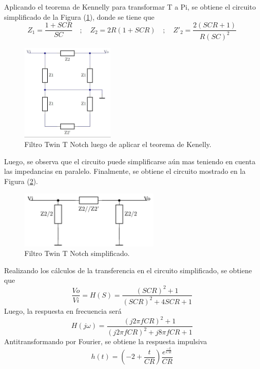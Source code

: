 \documentclass[a4paper]{article}
\begin{document}
Aplicando el teorema de Kennelly para transformar T a Pi, se obtiene el circuito simplificado de la Figura (\ref{fig:filtrosimplificado}), donde se tiene que
\[Z_1=\frac{1+SCR}{SC}\hspace{1em};\hspace{1em} Z_2=2R(1+SCR) \hspace{1em};\hspace{1em} Z'_2=\frac{2(SCR+1)}{R(SC)^2}\]

\begin{figure}[H]
	\centering
	\includegraphics[width=0.4\textwidth, trim={0 0.1cm  0 0.1cm},clip]{ej1kennellly.jpg}
\caption{Filtro Twin T Notch luego de aplicar el teorema de Kenelly.}
	\label{fig:filtrosimplificado}
\end{figure}

Luego, se observa que el circuito puede simplificarse aún mas teniendo en cuenta las impedancias en paralelo. Finalmente, se obtiene el circuito mostrado en la Figura (\ref{fig:filtrofinal}).

\begin{figure}[H]
	\centering
	\includegraphics[width=0.6\textwidth]{ej1simplificado.jpg}
\caption{Filtro Twin T Notch simplificado.}
	\label{fig:filtrofinal}
\end{figure}

Realizando los cálculos de la transferencia en el circuito simplificado, se obtiene que
\[ \frac{Vo}{Vi}=H(S)=\frac{ \left( SCR \right)^2 + 1}{\left( SCR \right)^2 + 4SCR + 1} \] 
Luego, la respuesta en frecuencia será
\[H(j\omega)=\frac{ \left( j 2\pi f CR \right)^2 + 1}{\left( j 2\pi f CR \right)^2 + j 8\pi fCR + 1} \]
Antitransformando por Fourier, se obtiene la respuesta impulsiva
\[h(t)=\left( -2 + \frac{t}{CR} \right)\frac{e^{\frac{-t}{CR}}}{CR} \]
\end{document}
